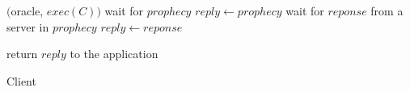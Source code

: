 \begin{algorithm}[h!]
\footnotesize

\begin{distribalgo}[1]



\vspace{1.0mm}

		\STATE \amcast$($oracle, $exec(C))$
		\STATE wait for $prophecy$
			\STATE $reply \leftarrow prophecy$
			\STATE wait for $reponse$ from a server in $prophecy$
			\STATE $reply \leftarrow reponse$
		\ENDIF

\STATE return $reply$ to the application

\vspace{1.0mm}



\ENDINDENT

\caption{Client}
\label{alg:client_proxy}
\end{distribalgo}
\end{algorithm}